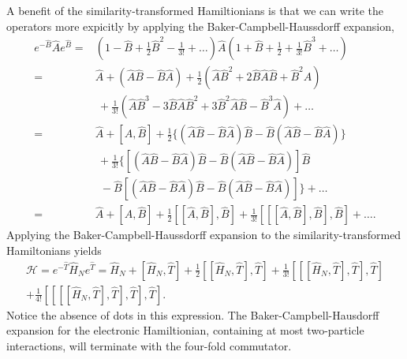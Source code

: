 A benefit of the similarity-transformed Hamiltionians is that we can write the operators
more expicitly by applying the Baker-Campbell-Haussdorff
expansion\cite{campbell1897law,baker1905alternants,hausdorff1906symbolische},
\begin{equation}
    \begin{aligned}
        e^{-\hat{B}}\hat{A}e^{\hat{B}}
        =& (1 - \hat{B} + \frac{1}{2}\hat{B}^2 - \frac{1}{3!} + \dots)
        \hat{A} (1 + \hat{B} + \frac{1}{2} + \frac{1}{3!}\hat{B}^3 + \dots) \\
        =& \hat{A} + (\hat{A}\hat{B} - \hat{B}\hat{A}) 
        + \frac{1}{2}(\hat{A}\hat{B}^2 + 2\hat{B}\hat{A}\hat{B} + \hat{B}^2\hat{A})
        \\ &\ + \frac{1}{3!}(
            \hat{A}\hat{B}^3 - 3\hat{B}\hat{A}\hat{B}^2 + 3\hat{B}^2\hat{A}\hat{B}
            - \hat{B}^3\hat{A}
        ) + \dots \\
        =& \hat{A} + [\hat{A}, \hat{B}] + 
        \frac{1}{2}\{
            (\hat{A}\hat{B} - \hat{B}\hat{A})\hat{B}
            -\hat{B}(\hat{A}\hat{B} - \hat{B}\hat{A})     
        \} \\ &\ + \frac{1}{3!} \{
            [(\hat{A}\hat{B} - \hat{B}\hat{A})\hat{B}
            -\hat{B}(\hat{A}\hat{B} - \hat{B}\hat{A})] \hat{B}\\
            &\ \ -\hat{B}[(\hat{A}\hat{B} - \hat{B}\hat{A})\hat{B}
            -\hat{B}(\hat{A}\hat{B} - \hat{B}\hat{A})]
        \} + \dots \\
        =& \hat{A} + [\hat{A}, \hat{B}]
        + \frac{1}{2}[[\hat{A}, \hat{B}], \hat{B}]
        + \frac{1}{3!} [[[\hat{A}, \hat{B}], \hat{B}], \hat{B}] + \dots .
    \end{aligned}
\end{equation}
Applying the Baker-Campbell-Haussdorff expansion to the similarity-transformed 
Hamiltonians yields
\begin{equation}
    \begin{gathered}
    \label{eq:bch_hamiltonian}
    \mathscr{H} = 
    e^{-\hat{T}}\hat{H}_Ne^{\hat{T}} = \hat{H}_N + [\hat{H}_N, \hat{T}]
        + \frac{1}{2}[[\hat{H}_N, \hat{T}], \hat{T}]
        + \frac{1}{3!}[[[\hat{H}_N, \hat{T}], \hat{T}], \hat{T}] \\
        + \frac{1}{4!}[[[[\hat{H}_N, \hat{T}], \hat{T}], \hat{T}], \hat{T}].
    \end{gathered}
\end{equation}
Notice the absence of dots in this expression. The Baker-Campbell-Hausdorff expansion 
for the electronic Hamiltionian, containing at most two-particle interactions, will 
terminate with the four-fold commutator.

